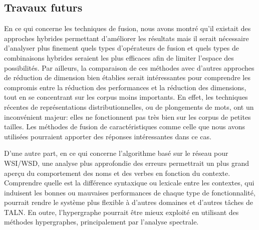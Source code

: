 \documentclass[a4paper,11pt,twoside]{article}
\begin{document}
\subsection{Travaux futurs}
%
En ce qui concerne les techniques de fusion, nous avons montré qu'il existait des approches hybrides permettant d'améliorer les résultats mais il serait nécessaire d'analyser plus finement quels types d'opérateurs de fusion et quels types de combinaisons hybrides seraient les plus efficaces afin de limiter l'espace des possibilités. Par ailleurs, la comparaison de ces méthodes avec d'autres approches de réduction de dimension bien établies serait intéressantes pour comprendre les compromis entre la réduction des performances et la réduction des dimensions, tout en se concentrant sur les corpus moins importants. En effet,  les techniques récentes de représentations distributionnelles, ou de plongements de mots, ont un inconvénient majeur: elles ne fonctionnent pas très bien sur les corpus de petites tailles. Les méthodes de fusion de caractéristiques comme celle que nous avons utilisées pourraient apporter des réponses intéressantes dans ce cas.

D'une autre part, en ce qui concerne l'algorithme basé sur le réseau pour WSI/WSD, une analyse plus approfondie des erreurs permettrait un plus grand aperçu du comportement des noms et des verbes en fonction du contexte. Comprendre quelle est la différence syntaxique ou lexicale entre les contextes, qui induisent les bonnes ou mauvaises performances de chaque type de fonctionnalité, pourrait rendre le système plus flexible à d'autres domaines et d'autres tâches de TALN. En outre, l'hypergraphe pourrait être mieux exploité en utilisant des méthodes hypergraphes, principalement par l'analyse spectrale.




\end{document}
